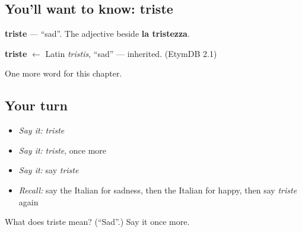 \subsection*{You'll want to know: triste}
\textbf{triste} — \textquotedblleft{}sad\textquotedblright{}. The adjective beside \textbf{la tristezza}.

\begin{cousinweb}
\textbf{triste} $\leftarrow$ Latin \emph{tristis}, \textquotedblleft{}sad\textquotedblright{} — inherited. (EtymDB 2.1)
\end{cousinweb}

\begin{grammarlens}[title={What you've built}]
One more word for this chapter.
\end{grammarlens}

\subsection*{Your turn}
\begin{itemize}
\raggedright
  \item \emph{Say it:} \emph{triste}
  \item \emph{Say it:} \emph{triste}, once more
  \item \emph{Say it:} say \emph{triste}
  \item \emph{Recall:} say the Italian for sadness, then the Italian for happy, then say \emph{triste} again
\end{itemize}

\begin{tcolorbox}[breakable,colback=teal!4,colframe=teal!35!black,title={Before you move on}]
What does triste mean? (\textquotedblleft{}Sad\textquotedblright{}.) Say it once more.
\end{tcolorbox}
